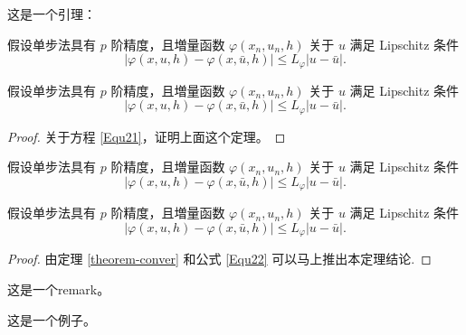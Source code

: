 \documentclass{shnuthesis}
\begin{document}
这是一个引理：
\begin{lemma}\label{lemma-conver}
假设单步法具有 $p$ 阶精度，且増量函数 $\varphi(x_{n}, u_{n}, h)$ 关于 $u$ 满足 Lipschitz 条件
\begin{equation}\label{Equ22}
|\varphi(x, u, h)-\varphi(x, \bar{u}, h)| \leqslant L_{\varphi}|u-\bar{u}|.
\end{equation}
\end{lemma}

\begin{theorem}\label{theorem-conver}
假设单步法具有 $p$ 阶精度，且増量函数 $\varphi(x_{n}, u_{n}, h)$ 关于 $u$ 满足 Lipschitz 条件
\begin{equation}\label{Equ23}
|\varphi(x, u, h)-\varphi(x, \bar{u}, h)| \leqslant L_{\varphi}|u-\bar{u}|.
\end{equation}
\end{theorem}
\begin{proof}
关于方程 \eqref{Equ21}，证明上面这个定理。
\end{proof}


\begin{theorem}\label{theorem-conver2}
假设单步法具有 $p$ 阶精度，且増量函数 $\varphi(x_{n}, u_{n}, h)$ 关于 $u$ 满足 Lipschitz 条件
\begin{equation}\label{Equ24}
|\varphi(x, u, h)-\varphi(x, \bar{u}, h)| \leqslant L_{\varphi}|u-\bar{u}|.
\end{equation}
\end{theorem}

\begin{corollary}\label{col-conver}
假设单步法具有 $p$ 阶精度，且増量函数 $\varphi(x_{n}, u_{n}, h)$ 关于 $u$ 满足 Lipschitz 条件
\begin{equation}\label{Equ25}
|\varphi(x, u, h)-\varphi(x, \bar{u}, h)| \leqslant L_{\varphi}|u-\bar{u}|.
\end{equation}
\end{corollary}
\begin{proof}
 由定理 \ref{theorem-conver} 和公式 \ref{Equ22} 可以马上推出本定理结论.
\end{proof}

\begin{remark}\label{rem2}
这是一个remark。
\end{remark}



\begin{example}
这是一个例子。
\end{example}
\end{document}
